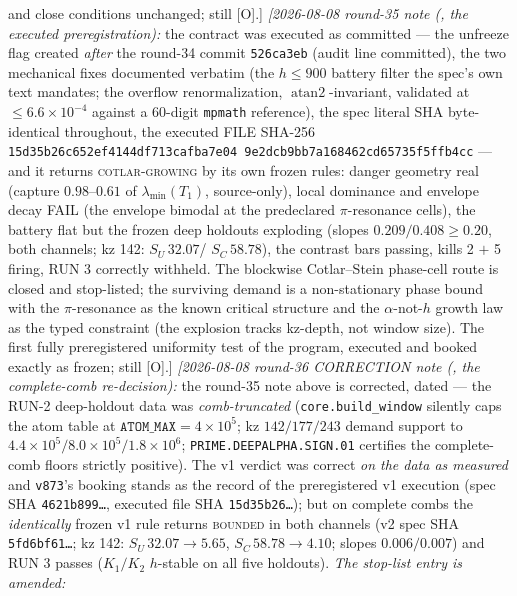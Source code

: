 \documentclass[11pt,a4paper]{article}
\begin{document}
{and close conditions unchanged; still [O].]
\emph{[2026-08-08 round-35 note
(, the executed
preregistration):} the contract was executed as committed --- the
unfreeze flag created \emph{after} the round-34 commit
\texttt{526ca3eb} (audit line committed), the two mechanical
fixes documented verbatim (the $h \le 900$ battery filter the
spec's own text mandates; the overflow renormalization,
$\operatorname{atan2}$-invariant, validated at $\le
6.6\times10^{-4}$ against a $60$-digit \texttt{mpmath}
reference), the spec literal SHA byte-identical throughout, the
executed FILE SHA-256
\texttt{15d35b26c652ef41\allowbreak 44df713cafba7e04\allowbreak
9e2dcb9bb7a16846\allowbreak 2cd65735f5ffb4cc} --- and it returns
\textsc{cotlar-growing} by its own frozen rules: danger geometry
real (capture $0.98$--$0.61$ of $\lambda_{\min}(T_1)$,
source-only), local dominance and envelope decay FAIL (the
envelope bimodal at the predeclared $\pi$-resonance cells), the
battery flat but the frozen deep holdouts exploding (slopes
$0.209/0.408 \ge 0.20$, both channels; kz 142: $S_U\,32.07$/
$S_C\,58.78$), the contrast bars passing, kills 2 $+$ 5 firing,
RUN 3 correctly withheld.  The blockwise Cotlar--Stein
phase-cell route is closed and stop-listed; the surviving demand
is a non-stationary phase bound with the $\pi$-resonance as the
known critical structure and the $\alpha$-not-$h$ growth law as
the typed constraint (the explosion tracks kz-depth, not window
size).  The first fully preregistered uniformity test of the
program, executed and booked exactly as frozen; still [O].]
\emph{[2026-08-08 round-36 CORRECTION note
(, the complete-comb
re-decision):} the round-35 note above is corrected, dated ---
the RUN-2 deep-holdout data was \emph{comb-truncated}
(\texttt{core.build\_window} silently caps the atom table at
$\texttt{ATOM\_MAX} = 4\times10^{5}$; kz $142/177/243$ demand
support to $4.4\times10^{5}/8.0\times10^{5}/1.8\times10^{6}$;
\texttt{PRIME.DEEPALPHA.SIGN.01} certifies the complete-comb
floors strictly positive).  The v1 verdict was correct \emph{on
the data as measured} and \texttt{v873}'s booking stands as the
record of the preregistered v1 execution (spec SHA
\texttt{4621b899\ldots}, executed file SHA
\texttt{15d35b26\ldots}); but on complete combs the
\emph{identically} frozen v1 rule returns \textsc{bounded} in
both channels (v2 spec SHA \texttt{5fd6bf61\ldots}; kz 142:
$S_U\,32.07 \to 5.65$, $S_C\,58.78 \to 4.10$; slopes
$0.006/0.007$) and RUN 3 passes ($K_1/K_2$ $h$-stable on all
five holdouts).  \emph{The stop-list entry is amended:}
}
\end{document}

